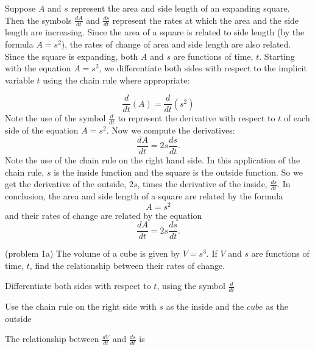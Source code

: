 \documentclass[handout]{ximera}
\begin{document}
\begin{example}[example 1]
Suppose $A$ and $s$ represent the area and side length of an expanding square. 
Then the symbols $\frac{dA}{dt}$ and $\frac{ds}{dt}$ represent the rates at which 
the area and the side length are increasing. Since the area of a square is related 
to side length (by the formula $A = s^2$), the rates of change of area and side 
length are also related. Since the square is expanding, both $A$ and $s$ are 
functions of time, $t$.
Starting with the equation $A = s^2$, we differentiate both sides with respect 
to the implicit variable $t$ using the chain rule where appropriate:

\[\frac{d}{dt} (A) = \frac{d}{dt}(s^2) \]
Note the use of the symbol $\frac{d}{dt}$ to represent the derivative with 
respect to $t$ of each side of the equation $A = s^2$. Now we compute the derivatives:
\[\frac{dA}{dt}  = 2s\frac{ds}{dt}. \]
Note the use of the chain rule on the right hand side. In this application of the 
chain rule, $s$ is the inside function and the square is the outside function. 
So we get the derivative of the outside, $2s$, times the derivative of the inside, $\frac{ds}{dt}$.
In conclusion, the area and side length of a square are related by the formula
\[A = s^2\]
and their rates of change are related by the equation
\[\frac{dA}{dt} = 2s \frac{ds}{dt}.\]
\end{example}


\begin{problem}(problem 1a)
The volume of a cube is given by $V = s^3$. If $V$ and $s$ are functions of time, $t$, 
find the relationship between their rates of change.\\
\begin{hint}
Differentiate both sides with respect to $t$, using the symbol $\frac{d}{dt}$
\end{hint}
\begin{hint}
Use the chain rule on the right side with $s$ as the inside and the $cube$ as the outside
\end{hint}

The relationship between $\frac{dV}{dt}$ and $\frac{ds}{dt}$ is
\begin{multipleChoice}
\end{multipleChoice}
\end{problem}
\end{document}
